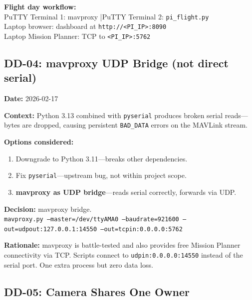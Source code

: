 \documentclass[10pt,a4paper]{article}
\newcommand{\ddlabel}[1]{\textbf{\color{headblue}#1}\hspace{0.5em}}
\begin{document}
\begin{infobox}
\textbf{Flight day workflow:}\\
PuTTY Terminal 1: mavproxy \quad|\quad PuTTY Terminal 2: \texttt{pi\_flight.py}\\
Laptop browser: dashboard at \texttt{http://<PI\_IP>:8090}\\
Laptop Mission Planner: TCP to \texttt{<PI\_IP>:5762}
\end{infobox}

\subsection{DD-04: mavproxy UDP Bridge (not direct serial)}
\label{sec:dd04}

\ddlabel{Date:} 2026-02-17

\ddlabel{Context:} Python 3.13 combined with \texttt{pyserial} produces broken serial reads---bytes are dropped, causing persistent \texttt{BAD\_DATA} errors on the MAVLink stream.

\ddlabel{Options considered:}
\begin{enumerate}
  \item Downgrade to Python 3.11---breaks other dependencies.
  \item Fix \texttt{pyserial}---upstream bug, not within project scope.
  \item \textbf{mavproxy as UDP bridge}---reads serial correctly, forwards via UDP.
\end{enumerate}

\begin{decisionbox}
\textbf{Decision:} mavproxy bridge.\\[2pt]
\texttt{\small mavproxy.py --master=/dev/ttyAMA0 --baudrate=921600 --out=udpout:127.0.0.1:14550 --out=tcpin:0.0.0.0:5762}
\end{decisionbox}

\ddlabel{Rationale:} mavproxy is battle-tested and also provides free Mission Planner connectivity via TCP. Scripts connect to \texttt{udpin:0.0.0.0:14550} instead of the serial port. One extra process but zero data loss.

\subsection{DD-05: Camera Shares One Owner}
\label{sec:dd05}
\end{document}
